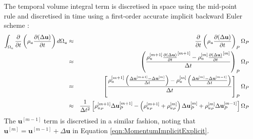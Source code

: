 \documentclass[sn-mathphys,Numbered,draft]{sn-jnl}%
\begin{document}
 The temporal volume integral term is discretised in space using the mid-point rule and discretised in time using a first-order accurate implicit backward Euler scheme \cite{jasak_application_2000}:
\begin{eqnarray} \label{eq:timeTerm}
	\int_{\mathrm{\Omega_u}} \frac{\partial }{\partial t} \left( \rho_u \frac{\partial (\Delta \mathbf{u}) }{\partial t} \right) d\mathrm{\Omega}_u
	&\approx&
	\frac{\partial }{\partial t} \left( \rho_u \frac{\partial (\Delta \mathbf{u}) }{\partial t} \right)_P \mathrm{\Omega}_P \notag \\
	&\approx&
	\left(
	\frac{ \rho_u^{[m+1]} \frac{\partial (\Delta \mathbf{u}) }{\partial t}^{[m+1]}
	- \rho_u^{[m]} \frac{\partial (\Delta \mathbf{u}) }{\partial t}^{[m]}}{ \Delta t } \right)_P
	\mathrm{\Omega}_P \notag \\
	&\approx&
	\left[
	\frac{ \rho_u^{[m+1]} \left(\frac{\Delta \mathbf{u}^{[m+1]} - \Delta \mathbf{u}^{[m]}}{\Delta t} \right)
	- \rho_u^{[m]} \left(\frac{\Delta \mathbf{u}^{[m]} - \Delta \mathbf{u}^{[m-1]}}{\Delta t} \right)
	}{ \Delta t } 
	\right]_P \mathrm{\Omega}_P \notag \\
	&\approx&
	\frac{1}{\Delta t^2} \left[
	 \rho_{u_P}^{[m+1]} \Delta \mathbf{u}^{[m+1]}_P
	- \left(\rho_{u_P}^{[m+1]} + \rho_{u_P}^{[m]} \right)  \Delta \mathbf{u}^{[m]}_P
	+ \rho_{u_P}^{[m]}  \Delta \mathbf{u}^{[m-1]}_P
	\right]
	 \mathrm{\Omega}_P
\end{eqnarray}
The $\boldsymbol{u}^{[m-1]}$ term is discretised in a similar fashion, noting that $\boldsymbol{u}^{[m]} = \boldsymbol{u}^{[m-1]} + \Delta \boldsymbol{u}$ in Equation \ref{eqn:MomentumImplicitExplicit}. 
\end{document}

